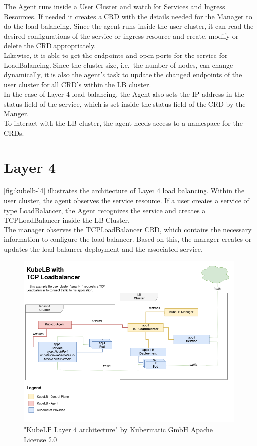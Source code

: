 The Agent runs inside a User Cluster and watch for Services and Ingress Resources.
If needed it creates a CRD with the details needed for the Manager to do the load balancing.
Since the agent runs inside the user cluster, it can read the desired configurations of the service or ingress resource and create, modify or delete the CRD appropriately.
\\
Likewise, it is able to get the endpoints and open ports for the service for LoadBalancing.
Since the cluster size, i.e.\ the number of nodes, can change dynamically, it is also the agent's task to update the changed endpoints of the user cluster for all CRD's within the LB cluster.
\\
In the case of Layer 4 load balancing, the Agent also sets the IP address in the status field of the service, which is set inside the status field of the CRD by the Manger.
\\
To interact with the LB cluster, the agent needs access to a namespace for the CRDs.

\section{Layer 4}

\autoref{fig:kubelb-l4} illustrates the architecture of Layer 4 load balancing.
Within the user cluster, the agent observes the service resource.
If a user creates a service of type LoadBalancer, the Agent recognizes the service and creates a TCPLoadBalancer inside the LB Cluster.
\\
The manager observes the TCPLoadBalancer CRD, which contains the necessary information to configure the load balancer.
Based on this, the manager creates or updates the load balancer deployment and the associated service.


\begin{figure}[H]
    \centering
    \includegraphics[width=1\linewidth]{media/06/kubelb-l4}
    \caption{"KubeLB Layer 4 architecture"  by Kubermatic GmbH Apache License 2.0}
    \label{fig:kubelb-l4}
\end{figure}

